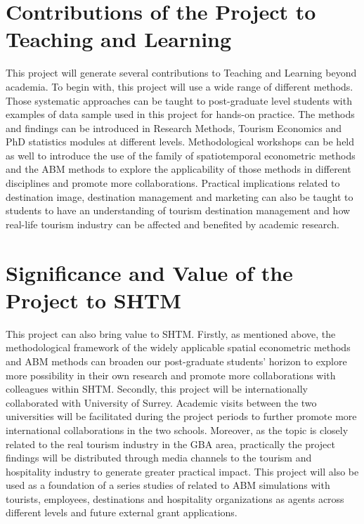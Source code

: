 \documentclass[11pt,a4paper]{amsart}
\theoremstyle{plain}
\theoremstyle{definition}
\begin{document}
\section{Contributions of the Project to Teaching and Learning}
\noindent This project will generate several contributions to Teaching and Learning beyond academia. To begin with, this project will use a wide range of different methods. Those systematic approaches can be taught to post-graduate level students with examples of data sample used in this project for hands-on practice. The methods and findings can be introduced in Research Methods, Tourism Economics and PhD statistics modules at different levels. Methodological workshops can be held as well to introduce the use of the family of spatiotemporal econometric methods and the ABM methods to explore the applicability of those methods in different disciplines and promote more collaborations. Practical implications related to destination image, destination management and marketing can also be taught to students to have an understanding of tourism destination management and how real-life tourism industry can be affected and benefited by academic research.

\section{Significance and Value of the Project to SHTM}
\noindent This project can also bring value to SHTM. Firstly, as mentioned above, the methodological framework of the widely applicable spatial econometric methods and ABM methods can broaden our post-graduate students’ horizon to explore more possibility in their own research and promote more collaborations with colleagues within SHTM. Secondly, this project will be internationally collaborated with University of Surrey. Academic visits between the two universities will be facilitated during the project periods to further promote more international collaborations in the two schools. Moreover, as the topic is closely related to the real tourism industry in the GBA area, practically the project findings will be distributed through media channels to the tourism and hospitality industry to generate greater practical impact. This project will also be used as a foundation of a series studies of related to ABM simulations with tourists, employees, destinations and hospitality organizations as agents across different levels and future external grant applications. 

\newpage
\printbibliography %
		
\end{document}
